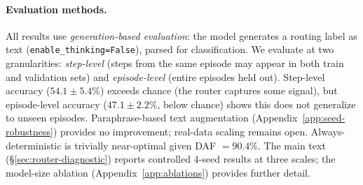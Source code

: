 \documentclass[11pt]{article}
\begin{document}
\paragraph{Evaluation methods.} All results use \emph{generation-based evaluation}: the model generates a routing label as text (\texttt{enable\_thinking=False}), parsed for classification. We evaluate at two granularities: \emph{step-level} (steps from the same episode may appear in both train and validation sets) and \emph{episode-level} (entire episodes held out). Step-level accuracy ($54.1 \pm 5.4\%$) exceeds chance (the router captures some signal), but episode-level accuracy ($47.1 \pm 2.2\%$, below chance) shows this does not generalize to unseen episodes. Paraphrase-based text augmentation (Appendix~\ref{app:seed-robustness}) provides no improvement; real-data scaling remains open. Always-deterministic is trivially near-optimal given DAF $= 90.4\%$. The main text (\S\ref{sec:router-diagnostic}) reports controlled 4-seed results at three scales; the model-size ablation (Appendix~\ref{app:ablations}) provides further detail.

\begin{table}[h]
\centering
\small
{}
\caption{Router training hyperparameters. Both architectures use the same base model with LoRA adaptation. The classification head degenerates across all configurations; the implicit router results are reported as 4-seed mean$\pm$std.}
\label{tab:hyperparams}
\end{table}
\end{document}
